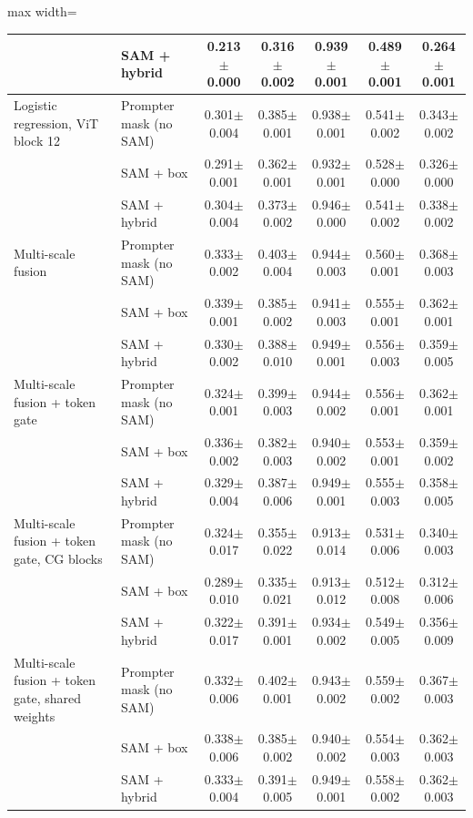 \begin{table}[htbp]
\begin{adjustbox}{max width=\linewidth}
\begin{tabular}{llccccc}
 & SAM + hybrid & 0.213$\pm$0.000 & 0.316$\pm$0.002 & 0.939$\pm$0.001 & 0.489$\pm$0.001 & 0.264$\pm$0.001 \\
\midrule
Logistic regression, ViT block 12 & Prompter mask (no SAM) & 0.301$\pm$0.004 & 0.385$\pm$0.001 & 0.938$\pm$0.001 & 0.541$\pm$0.002 & 0.343$\pm$0.002 \\
 & SAM + box & 0.291$\pm$0.001 & 0.362$\pm$0.001 & 0.932$\pm$0.001 & 0.528$\pm$0.000 & 0.326$\pm$0.000 \\
 & SAM + hybrid & 0.304$\pm$0.004 & 0.373$\pm$0.002 & 0.946$\pm$0.000 & 0.541$\pm$0.002 & 0.338$\pm$0.002 \\
\midrule
Multi-scale fusion & Prompter mask (no SAM) & 0.333$\pm$0.002 & 0.403$\pm$0.004 & 0.944$\pm$0.003 & 0.560$\pm$0.001 & 0.368$\pm$0.003 \\
 & SAM + box & 0.339$\pm$0.001 & 0.385$\pm$0.002 & 0.941$\pm$0.003 & 0.555$\pm$0.001 & 0.362$\pm$0.001 \\
 & SAM + hybrid & 0.330$\pm$0.002 & 0.388$\pm$0.010 & 0.949$\pm$0.001 & 0.556$\pm$0.003 & 0.359$\pm$0.005 \\
\midrule
Multi-scale fusion + token gate & Prompter mask (no SAM) & 0.324$\pm$0.001 & 0.399$\pm$0.003 & 0.944$\pm$0.002 & 0.556$\pm$0.001 & 0.362$\pm$0.001 \\
 & SAM + box & 0.336$\pm$0.002 & 0.382$\pm$0.003 & 0.940$\pm$0.002 & 0.553$\pm$0.001 & 0.359$\pm$0.002 \\
 & SAM + hybrid & 0.329$\pm$0.004 & 0.387$\pm$0.006 & 0.949$\pm$0.001 & 0.555$\pm$0.003 & 0.358$\pm$0.005 \\
\midrule
Multi-scale fusion + token gate, CG blocks & Prompter mask (no SAM) & 0.324$\pm$0.017 & 0.355$\pm$0.022 & 0.913$\pm$0.014 & 0.531$\pm$0.006 & 0.340$\pm$0.003 \\
 & SAM + box & 0.289$\pm$0.010 & 0.335$\pm$0.021 & 0.913$\pm$0.012 & 0.512$\pm$0.008 & 0.312$\pm$0.006 \\
 & SAM + hybrid & 0.322$\pm$0.017 & 0.391$\pm$0.001 & 0.934$\pm$0.002 & 0.549$\pm$0.005 & 0.356$\pm$0.009 \\
\midrule
Multi-scale fusion + token gate, shared weights & Prompter mask (no SAM) & 0.332$\pm$0.006 & 0.402$\pm$0.001 & 0.943$\pm$0.002 & 0.559$\pm$0.002 & 0.367$\pm$0.003 \\
 & SAM + box & 0.338$\pm$0.006 & 0.385$\pm$0.002 & 0.940$\pm$0.002 & 0.554$\pm$0.003 & 0.362$\pm$0.003 \\
 & SAM + hybrid & 0.333$\pm$0.004 & 0.391$\pm$0.005 & 0.949$\pm$0.001 & 0.558$\pm$0.002 & 0.362$\pm$0.003 \\

\end{tabular}
\end{adjustbox}
\end{table}
